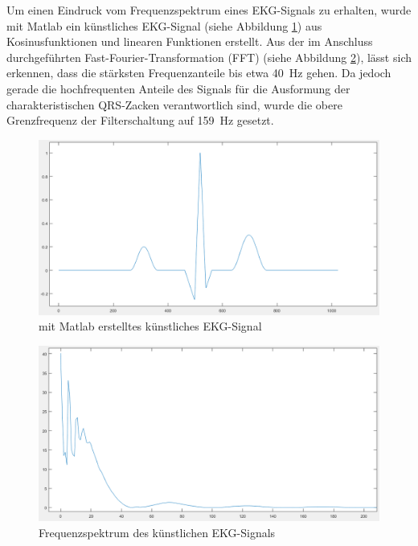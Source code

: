 Um einen Eindruck vom Frequenzspektrum eines EKG-Signals zu erhalten, wurde mit Matlab ein künstliches EKG-Signal (siehe Abbildung \ref{Matlab EKG-Signal}) aus Kosinusfunktionen und linearen Funktionen erstellt. Aus der im Anschluss durchgeführten Fast-Fourier-Transformation (FFT) (siehe Abbildung \ref{Matlab Frequenzspektrum}), lässt sich erkennen, dass die stärksten Frequenzanteile bis etwa \SI{40}{\hertz} gehen. Da jedoch gerade die hochfrequenten Anteile des Signals für die Ausformung der charakteristischen QRS-Zacken verantwortlich sind, wurde die obere Grenzfrequenz der Filterschaltung auf \SI{159}{\hertz} gesetzt. 

\begin{figure} [!h]
	\includegraphics[width=\textwidth] {EKG_Signal.png}
	\caption{mit Matlab erstelltes künstliches EKG-Signal}
	\label{Matlab EKG-Signal} 
\end{figure}

\begin{figure} [!h]
	\includegraphics[width=\textwidth] {EKG_diskretes_Frequenzspektrum_Ausschnitt.png}
	\caption{Frequenzspektrum des künstlichen EKG-Signals}
	\label{Matlab Frequenzspektrum} 
\end{figure}

